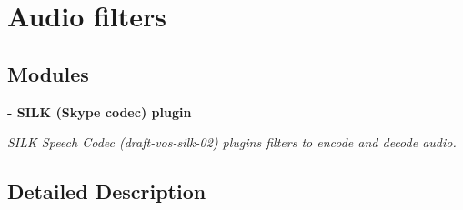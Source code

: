 \section{Audio filters}
\label{group__audiofilters}
\subsection*{Modules}
\begin{DoxyCompactItemize}
\item 
{\bf -\/ S\-I\-L\-K (\-Skype codec)  plugin}
\begin{DoxyCompactList}\small\item\em S\-I\-L\-K Speech Codec (draft-\/vos-\/silk-\/02) plugins filters to encode and decode audio. \end{DoxyCompactList}\end{DoxyCompactItemize}


\subsection{Detailed Description}
